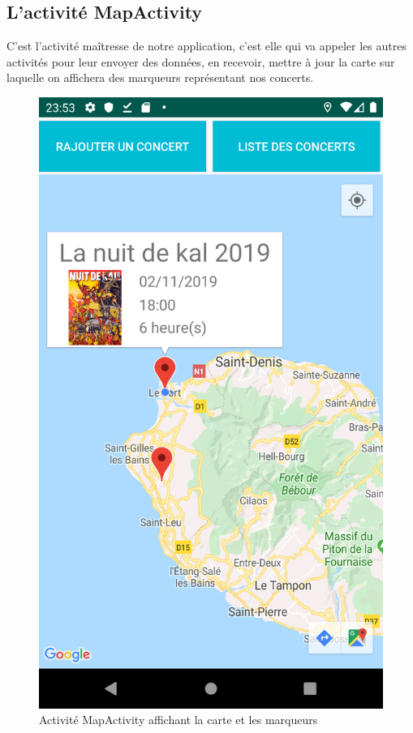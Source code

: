 \documentclass{article}
\begin{document}
\subsection{L'activité MapActivity}

C'est l'activité maîtresse de notre application, c'est elle qui va appeler les autres activités pour leur envoyer des données, en recevoir, mettre à jour la carte sur laquelle on affichera des marqueurs représentant nos concerts. 
\begin{figure}[h!]
\centering
\includegraphics[scale=0.14]{./img/map.png}
\caption{Activité MapActivity affichant la carte et les marqueurs \label{fig:concert_layout}}
\end{figure}
\end{document}
